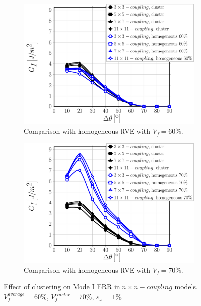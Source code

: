 \documentclass[review]{elsarticle}
\begin{document}
\begin{figure}[!h]
\centering
    \begin{subfigure}[b]{0.475\textwidth}
        \includegraphics[width=\textwidth]{nxn-coupling-vf60-GI.pdf}
        \caption{Comparison with homogeneous RVE with $V_{f}=60\%$.}\label{subfig:clusterCouplingnxnModeI60}
    \end{subfigure}\quad
    \begin{subfigure}[b]{0.475\textwidth}
        \includegraphics[width=\textwidth]{nxn-coupling-vf70-GI.pdf}
        \caption{Comparison with homogeneous RVE with $V_{f}=70\%$.}\label{subfig:clusterCouplingnxnModeI70}
    \end{subfigure}

\caption{Effect of clustering on Mode I ERR in $n\times n-coupling$ models. $V^{average}_{f}=60\%$, $V^{cluster}_{f}=70\%$, $\varepsilon_{x}=1\%$.}\label{fig:clusterCouplingnxnModeI}
\end{figure}
\end{document}
